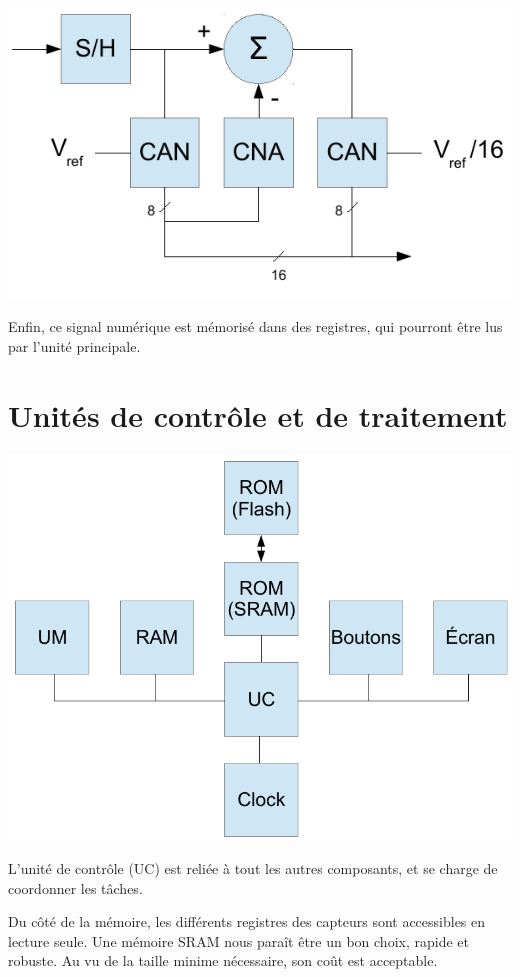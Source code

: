 \documentclass[a4paper]{article} %
\begin{document}
\begin{center}
\includegraphics[scale=0.6]{can.pdf}
\end{center}

Enfin, ce signal numérique est mémorisé dans des registres, qui pourront être lus par l'unité principale.


\section{Unités de contrôle et de traitement}

\begin{center}
\includegraphics[scale=0.6]{uc.pdf}
\end{center}

L'unité de contrôle (UC) est reliée à tout les autres composants, et se charge de coordonner les tâches.

Du côté de la mémoire, les différents registres des capteurs sont accessibles en lecture seule.
Une mémoire SRAM nous paraît être un bon choix, rapide et robuste.
Au vu de la taille minime nécessaire, son coût est acceptable.
\end{document}
